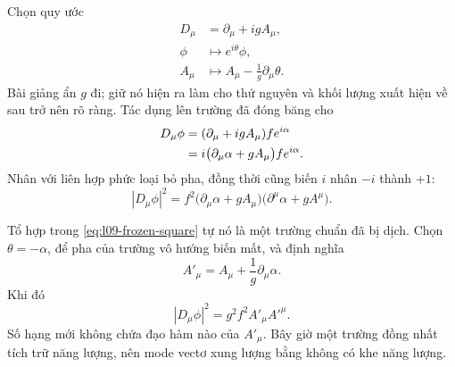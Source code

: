 Chọn quy ước
\begin{equation}
\begin{aligned}
  D_\mu&=\partial_\mu+igA_\mu,
  \\
  \phi&\longmapsto e^{i\theta}\phi,
  \\
  A_\mu&\longmapsto A_\mu-\frac1g\partial_\mu\theta .
\end{aligned}
  \label{eq:l09-gauge-convention}
\end{equation}
Bài giảng ẩn \(g\) đi; giữ nó hiện ra làm cho thứ nguyên và khối lượng xuất hiện về sau trở nên rõ ràng. Tác dụng lên trường đã đóng băng cho
\begin{align}
  D_\mu\phi
  &=(\partial_\mu+igA_\mu)f e^{i\alpha}
  \notag\\
  &=i\bigl(\partial_\mu\alpha+gA_\mu\bigr)
    f e^{i\alpha}.
  \label{eq:l09-covariant-frozen}
\end{align}
Nhân với liên hợp phức loại bỏ pha, đồng thời cũng biến \(i\) nhân \(-i\) thành \(+1\):
\begin{equation}
  |D_\mu\phi|^2
  =f^2
   \bigl(\partial_\mu\alpha+gA_\mu\bigr)
   \bigl(\partial^\mu\alpha+gA^\mu\bigr).
  \label{eq:l09-frozen-square}
\end{equation}

\begin{classroomqa}
\end{classroomqa}

Tổ hợp trong \eqref{eq:l09-frozen-square} tự nó là một trường chuẩn đã bị dịch. Chọn \(\theta=-\alpha\), để pha của trường vô hướng biến mất, và định nghĩa
\begin{equation}
  A'_\mu=A_\mu+\frac1g\partial_\mu\alpha .
  \label{eq:l09-unitary-gauge-field}
\end{equation}
Khi đó
\begin{equation}
  |D_\mu\phi|^2=g^2f^2 A'_\mu A'^\mu .
  \label{eq:l09-vector-mass-term}
\end{equation}
Số hạng mới không chứa đạo hàm nào của \(A'_\mu\). Bây giờ một trường đồng nhất tích trữ năng lượng, nên mode vectơ xung lượng bằng không có khe năng lượng.


